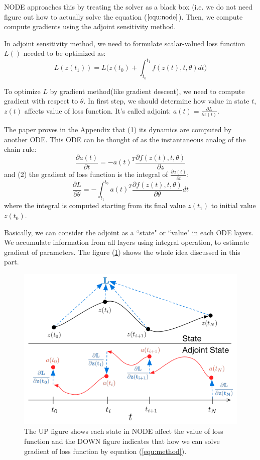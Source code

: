 \documentclass{article}
\begin{document}
NODE approaches this by treating the solver as a black box (i.e. we do not need figure out how to actually solve the equation ($\ref{equ:node}$). 
Then, we compute compute gradients using the adjoint sensitivity method\cite{Chambers2006TheProcesses}. 

In adjoint sensitivity method, we need to formulate scalar-valued loss function $L()$ needed to be optimized as: 
$$
    L(z(t_1)) = L\bigg(z(t_0)+\int_{t_0}^{t_1}f(z(t), t, \theta)d t\bigg)
$$

To optimize $L$ by gradient method(like gradient descent), we need to compute gradient with respect to $\theta$. In first step, we should determine how value in state $t$, $z(t)$ affects value of loss function. It's called adjoint: $a(t)=\frac{\partial L}{\partial z(t)}$.

The paper\cite{Chen2018NeuralEquations} proves in the Appendix that (1) its dynamics are computed by another ODE. This ODE can be thought of as the instantaneous analog of the chain rule: 
$$
    \frac{\partial a(t)}{\partial t} = -a(t)^T\frac{\partial f(z(t), t, \theta)}{\partial z}
$$
and (2) the gradient of loss function is the integral of $\frac{\partial a(t)}{\partial t}$:
\begin{equation}
    \label{equ:method}
    \frac{\partial L}{\partial \theta} = - \int_{t_1}^{t_0}a(t)^T\frac{\partial f(z(t),t,\theta)}{\partial \theta}d t
\end{equation}
where the integral is computed starting from its final value $z(t_1)$ to initial value $z(t_0)$.

Basically, we can consider the adjoint as a ``state" or ``value" in each ODE layers. We accumulate information from all layers using integral operation, to estimate gradient of parameters. The figure (\ref{fig:method}) shows the whole idea discussed in this part.

\begin{figure}[ht]
\vskip 0.05in
\begin{center}
\centerline{\includegraphics[width=.5\textwidth]{method.png}}
\caption{The UP figure shows each state in NODE affect the value of loss function and the DOWN figure indicates that how we can solve gradient of loss function by equation (\ref{equ:method}).}
\label{fig:method}
\end{center}
\vskip -0.05in
\end{figure}
\end{document}
